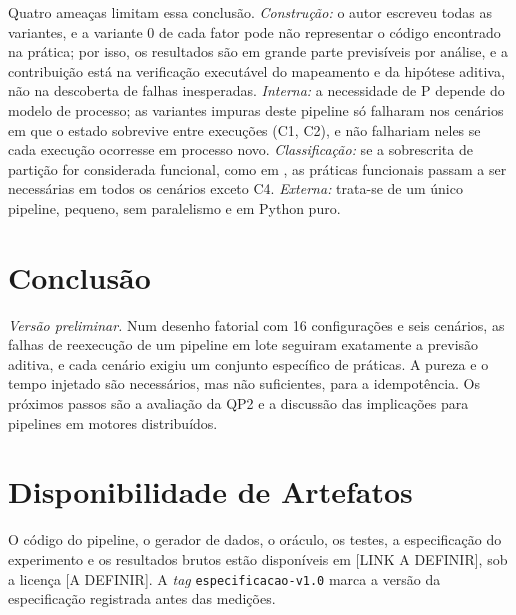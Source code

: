 Quatro ameaças limitam essa conclusão. \emph{Construção:} o autor escreveu todas as variantes, e a variante 0 de cada fator pode não representar o código encontrado na prática; por isso, os resultados são em grande parte previsíveis por análise, e a contribuição está na verificação executável do mapeamento e da hipótese aditiva, não na descoberta de falhas inesperadas. \emph{Interna:} a necessidade de P depende do modelo de processo; as variantes impuras deste pipeline só falharam nos cenários em que o estado sobrevive entre execuções (C1, C2), e não falhariam neles se cada execução ocorresse em processo novo. \emph{Classificação:} se a sobrescrita de partição for considerada funcional, como em \citet{beauchemin2018}, as práticas funcionais passam a ser necessárias em todos os cenários exceto C4. \emph{Externa:} trata-se de um único pipeline, pequeno, sem paralelismo e em Python puro.

\section{Conclusão}

\emph{Versão preliminar.} Num desenho fatorial com 16 configurações e seis cenários, as falhas de reexecução de um pipeline em lote seguiram exatamente a previsão aditiva, e cada cenário exigiu um conjunto específico de práticas. A pureza e o tempo injetado são necessários, mas não suficientes, para a idempotência. Os próximos passos são a avaliação da QP2 e a discussão das implicações para pipelines em motores distribuídos.

\section*{Disponibilidade de Artefatos}

O código do pipeline, o gerador de dados, o oráculo, os testes, a especificação do experimento e os resultados brutos estão disponíveis em [LINK A DEFINIR], sob a licença [A DEFINIR]. A \emph{tag} \texttt{especificacao-v1.0} marca a versão da especificação registrada antes das medições.
